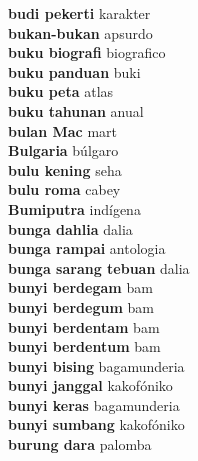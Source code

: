 \textbf{ budi pekerti  } karakter \\
\textbf{ bukan-bukan  } apsurdo \\
\textbf{ buku biografi  } biografico \\
\textbf{ buku panduan  } buki \\
\textbf{ buku peta  } atlas \\
\textbf{ buku tahunan  } anual \\
\textbf{ bulan Mac  } mart \\
\textbf{ Bulgaria  } búlgaro \\
\textbf{ bulu kening  } seha \\
\textbf{ bulu roma  } cabey \\
\textbf{ Bumiputra  } indígena \\
\textbf{ bunga dahlia  } dalia \\
\textbf{ bunga rampai  } antologia \\
\textbf{ bunga sarang tebuan  } dalia \\
\textbf{ bunyi berdegam  } bam \\
\textbf{ bunyi berdegum  } bam \\
\textbf{ bunyi berdentam  } bam \\
\textbf{ bunyi berdentum  } bam \\
\textbf{ bunyi bising  } bagamunderia \\
\textbf{ bunyi janggal  } kakofóniko \\
\textbf{ bunyi keras  } bagamunderia \\
\textbf{ bunyi sumbang  } kakofóniko \\
\textbf{ burung dara  } palomba \\
